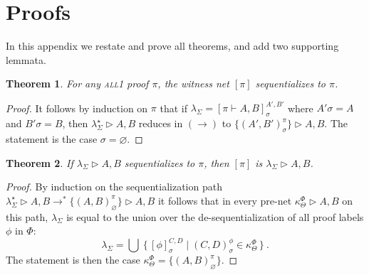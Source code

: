 \documentclass[UKenglish]{lipics-v2019}
\newcommand\all{\textsc{all}}
\newcommand\+{+}
\renewcommand\*{\times}
\newcommand\prf[3]{#1\vdash\!#2,#3}
\newcommand\net[3]{#1\triangleright #2,#3}
\newcommand\deseq[4][\sigma]{[#2]_{#1}^{#3,#4}}
\newcommand\link[3][\sigma]{(#2,#3)_{#1}}
\newcommand\scoal{\rightarrow} %
\begin{document}


%






\newpage
\appendix

\theoremstyle{plain}
\newtheorem{retheorem}{Theorem}
\newtheorem{relemma}[retheorem]{Lemma}


\section{Proofs}

In this appendix we restate and prove all theorems, and add two supporting lemmata.

\addtocounter{retheorem}{-1}
\begin{retheorem}
For any \all1 proof $\pi$, the witness net $[\pi]$ sequentializes to $\pi$. 
\end{retheorem}

\begin{proof}
It follows by induction on $\pi$ that if $\lambda_\Sigma=\deseq{\prf\pi AB}{A'}{B'}$ where $A'\sigma=A$ and $B'\sigma=B$, then $\net{\lambda^\star_\Sigma}AB$ reduces in $(\scoal)$ to $\net{\{\link{A'}{B'}^\pi\}}AB$. The statement is the case $\sigma=\varnothing$.
\end{proof}

\addtocounter{retheorem}{-1}
\begin{retheorem}
If $\net{\lambda_\Sigma}AB$ sequentializes to $\pi$, then $[\pi]$ is $\net{\lambda_\Sigma}AB$. 
\end{retheorem}

\begin{proof}
By induction on the sequentialization path 
$\net{\lambda_\Sigma^\star}AB\scoal^*\net{\{\link[\varnothing]AB^\pi\}}AB$
it follows that in every pre-net $\net{\kappa_\Theta^\Phi}AB$ on this path, $\lambda_\Sigma$ is equal to the union over the de-sequentialization of all proof labels $\phi$ in $\Phi$:
\[
	\lambda_\Sigma=\bigcup~\{\,\deseq\phi CD \mid \link CD^\phi \in \kappa_\Theta^\Phi\,\}~.
\]
The statement is then the case $\kappa_\Theta^\Phi=\{\link[\varnothing]AB^\pi\}$.
\end{proof}
\end{document}
